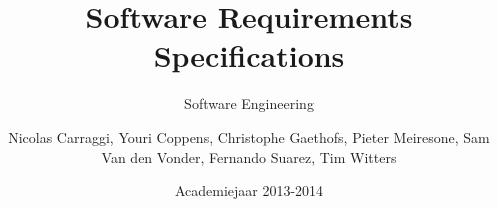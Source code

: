 \author{Nicolas Carraggi, Youri Coppens, Christophe Gaethofs, Pieter Meiresone, Sam Van den Vonder, Fernando Suarez, Tim Witters}
\title{Software Requirements Specifications}
\subtitle{Software Engineering} 
\date{Academiejaar 2013-2014}

\makeassignment

